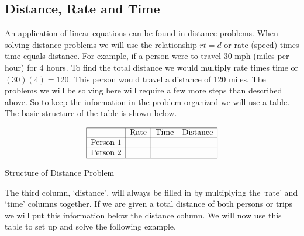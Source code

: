 \subsection{Distance, Rate and Time}\pp

 {}\pp

 An application of linear equations can be found in distance problems. When
solving distance problems we will use the relationship $r t = d$ or rate
(speed) times time equals distance. For example, if a person were to travel 30
mph (miles per hour) for 4 hours. To find the total distance we would multiply rate times time
or $(30) (4) = 120$. This person would travel a distance of 120 miles. The problems
we will be solving here will require a few more steps than described above. So to
keep the information in the problem organized we will use a table. The basic structure of the table is shown below.

\[%
  \begin{array}{|c|c|c|c|}
    \hline
    & \mbox{Rate} & \mbox{Time} & \mbox{Distance}\\
    \hline
    \mbox{Person~1} &  &  & \\
    \hline
    \mbox{Person~2} &  &  & \\
    \hline
  \end{array} \]
	\begin{center}
	\small{Structure of Distance Problem}
  \end{center}

 The third column, `distance', will always be filled in by multiplying the `rate'
and `time' columns together. If we are given a total distance of both persons or
trips we will put this information below the distance column. We will now use
this table to set up and solve the following example.

